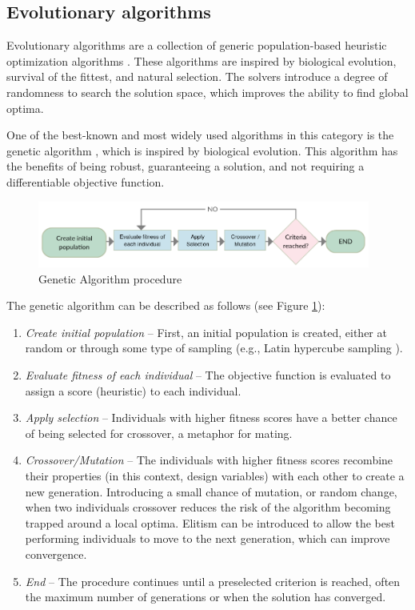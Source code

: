 \subsection{Evolutionary algorithms}
Evolutionary algorithms are a collection of generic population-based heuristic optimization algorithms \cite{Bangert2012}. These algorithms are inspired by biological evolution, survival of the fittest, and natural selection. The solvers introduce a degree of randomness to search the solution space, which improves the ability to find global optima.

One of the best-known and most widely used algorithms in this category is the genetic algorithm \cite{Goldberg1989}, which is inspired by biological evolution. This algorithm has the benefits of being robust, guaranteeing a solution, and not requiring a differentiable objective function. 

\begin{figure}
  \includegraphics[width=310pt]{graphics/ga.png}
  \caption{Genetic Algorithm procedure}
  \label{fig:ga}
\end{figure}


The genetic algorithm can be described as follows (see Figure \ref{fig:ga}):

\begin{enumerate} 
\item \textit{Create initial population }– First, an initial population is created, either at random or through some type of sampling (e.g., Latin hypercube sampling \cite{10.2307/1268522}).
\item \textit{Evaluate fitness of each individual} – The objective function is evaluated to assign a score (heuristic) to each individual.
\item \textit{Apply selection} – Individuals with higher fitness scores have a better chance of being selected for crossover, a metaphor for mating.
\item \textit{Crossover/Mutation} – The individuals with higher fitness scores recombine their properties (in this context, design variables) with each other to create a new generation. Introducing a small chance of mutation, or random change, when two individuals crossover reduces the risk of the algorithm becoming trapped around a local optima. Elitism can be introduced to allow the best performing individuals to move to the next generation, which can improve convergence. 
\item \textit{End} – The procedure continues until a preselected criterion is reached, often the maximum number of generations or when the solution has converged.
\end{enumerate} 


